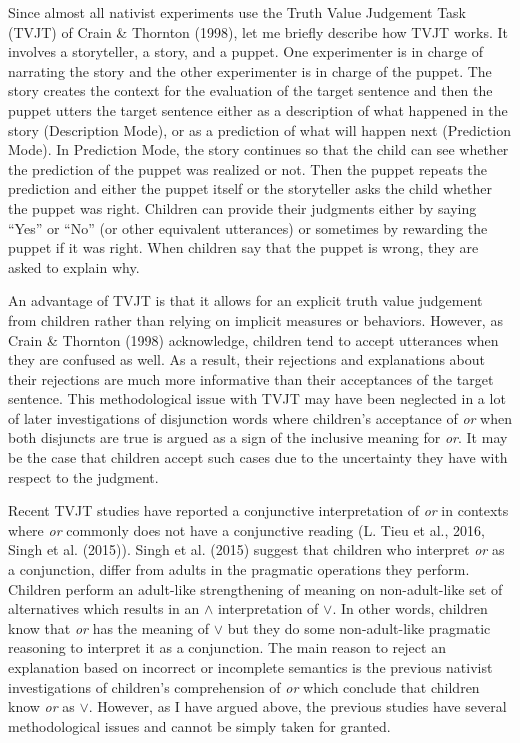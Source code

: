 \documentclass[oneside]{report}
\theoremstyle{definition}
\theoremstyle{definition}
\theoremstyle{definition}
\theoremstyle{remark}
\begin{document}
Since almost all nativist experiments use the Truth Value Judgement Task
(TVJT) of Crain \& Thornton (1998), let me briefly describe how TVJT
works. It involves a storyteller, a story, and a puppet. One
experimenter is in charge of narrating the story and the other
experimenter is in charge of the puppet. The story creates the context
for the evaluation of the target sentence and then the puppet utters the
target sentence either as a description of what happened in the story
(Description Mode), or as a prediction of what will happen next
(Prediction Mode). In Prediction Mode, the story continues so that the
child can see whether the prediction of the puppet was realized or not.
Then the puppet repeats the prediction and either the puppet itself or
the storyteller asks the child whether the puppet was right. Children
can provide their judgments either by saying ``Yes'' or ``No'' (or other
equivalent utterances) or sometimes by rewarding the puppet if it was
right. When children say that the puppet is wrong, they are asked to
explain why.

An advantage of TVJT is that it allows for an explicit truth value
judgement from children rather than relying on implicit measures or
behaviors. However, as Crain \& Thornton (1998) acknowledge, children
tend to accept utterances when they are confused as well. As a result,
their rejections and explanations about their rejections are much more
informative than their acceptances of the target sentence. This
methodological issue with TVJT may have been neglected in a lot of later
investigations of disjunction words where children's acceptance of
\emph{or} when both disjuncts are true is argued as a sign of the
inclusive meaning for \emph{or}. It may be the case that children accept
such cases due to the uncertainty they have with respect to the
judgment.

Recent TVJT studies have reported a conjunctive interpretation of
\emph{or} in contexts where \emph{or} commonly does not have a
conjunctive reading (L. Tieu et al., 2016, Singh et al. (2015)). Singh
et al. (2015) suggest that children who interpret \emph{or} as a
conjunction, differ from adults in the pragmatic operations they
perform. Children perform an adult-like strengthening of meaning on
non-adult-like set of alternatives which results in an \(\land\)
interpretation of \(\lor\). In other words, children know that \emph{or}
has the meaning of \(\lor\) but they do some non-adult-like pragmatic
reasoning to interpret it as a conjunction. The main reason to reject an
explanation based on incorrect or incomplete semantics is the previous
nativist investigations of children's comprehension of \emph{or} which
conclude that children know \emph{or} as \(\lor\). However, as I have
argued above, the previous studies have several methodological issues
and cannot be simply taken for granted.
\end{document}
